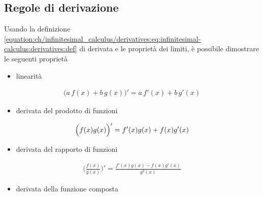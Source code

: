\documentclass[letterpaper,10pt,english]{jupyterBook}
\begin{document}
\subsection{Regole di derivazione}
\label{\detokenize{ch/infinitesimal_calculus/derivatives:regole-di-derivazione}}\label{\detokenize{ch/infinitesimal_calculus/derivatives:infinitesimal-calculus-derivatives-rules}}
\sphinxAtStartPar
Usando la definizione \eqref{equation:ch/infinitesimal_calculus/derivatives:eq:infinitesimal-calculus:derivatives:def} di derivata e le proprietà dei limiti, è possibile dimostrare le seguenti proprietà
\begin{itemize}
\item {} 
\sphinxAtStartPar
linearità

\end{itemize}
\begin{equation}\label{equation:ch/infinitesimal_calculus/derivatives:infinitesimal-calculus:derivatives:rules:linearity}
\begin{split}\big( a \, f(x) + b \, g(x) \big)' = a \, f'(x) + b \, g'(x)\end{split}
\end{equation}\begin{itemize}
\item {} 
\sphinxAtStartPar
derivata del prodotto di funzioni

\end{itemize}
\begin{equation}\label{equation:ch/infinitesimal_calculus/derivatives:infinitesimal-calculus:derivatives:rules:product}
\begin{split}\Bigl( f(x) g(x) \Bigr)' = f'(x) g(x) + f(x) g'(x)\end{split}
\end{equation}\begin{itemize}
\item {} 
\sphinxAtStartPar
derivata del rapporto di funzioni

\end{itemize}
\begin{equation}\label{equation:ch/infinitesimal_calculus/derivatives:infinitesimal-calculus:derivatives:rules:division}
\begin{split}\Big( \frac{f(x)}{g(x)} \Big)' = \frac{f'(x) g(x) - f(x) g'(x)}{g^2(x)}\end{split}
\end{equation}\begin{itemize}
\item {} 
\sphinxAtStartPar
derivata della funzione composta

\end{itemize}
\end{document}
